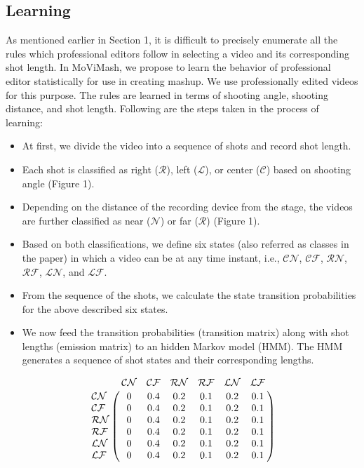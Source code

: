 \documentclass{sig-alternate}
\begin{document}
{{{\subsection{Learning}
As mentioned earlier in Section 1, it is difficult to precisely enumerate
all the rules which professional editors follow in selecting
a video and its corresponding shot length. In MoViMash, we propose
to learn the behavior of professional editor statistically for use
in creating mashup. We use professionally edited videos for this
purpose. The rules are learned in terms of shooting angle, shooting
distance, and shot length. Following are the steps taken in the
process of learning:
\begin{itemize}
    \item At first, we divide the video into a sequence of shots and
record shot length.
\item Each shot is classified as right ($\mathcal{R}$), left ($\mathcal{L}$), or center ($\mathcal{C}$)
based on shooting angle (Figure 1).
\item Depending on the distance of the recording device from the
stage, the videos are further classified as near ($\mathcal{N}$) or far ($\mathcal{R}$)
(Figure 1).
   \item Based on both classifications, we define six states (also referred
as classes in the paper) in which a video can be at any
time instant, i.e., $\mathcal{CN}$, $\mathcal{CF}$, $\mathcal{RN}$, $\mathcal{RF}$, $\mathcal{LN}$, and $\mathcal{LF}$.
  \item  From the sequence of the shots, we calculate the state transition
probabilities for the above described six states.
  \item  We now feed the transition probabilities (transition matrix)
along with shot lengths (emission matrix) to an hidden Markov
model (HMM). The HMM generates a sequence of shot states
and their corresponding lengths.
\end{itemize}
$$
\bordermatrix{~ &\mathcal{CN} & \mathcal{CF}& \mathcal{RN}& \mathcal{RF}& \mathcal{LN}&\mathcal{LF} \cr
  \mathcal{CN} &0& 0.4& 0.2 &0.1& 0.2& 0.1 \cr
  \mathcal{CF}  &0& 0.4& 0.2 &0.1& 0.2& 0.1 \cr
  \mathcal{RN}  &0& 0.4& 0.2 &0.1& 0.2& 0.1 \cr
  \mathcal{RF}  &0& 0.4& 0.2 &0.1& 0.2& 0.1 \cr
  \mathcal{LN}  &0& 0.4& 0.2 &0.1& 0.2& 0.1 \cr
  \mathcal{LF}  &0& 0.4& 0.2 &0.1& 0.2& 0.1 \cr
  }
$$

}}}
\end{document}
